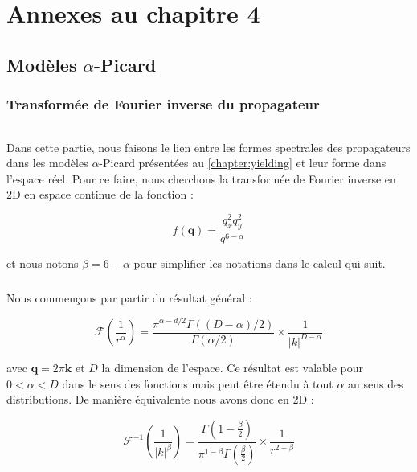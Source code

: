 \FloatBarrier

\chapter{Annexes au chapitre 4}



\section{Modèles $\alpha$-Picard}

\stoptocwriting

\subsection{Transformée de Fourier inverse du propagateur}

\label{sec:TFinverse}

\subparagraph{}Dans cette partie, nous faisons le lien entre les formes spectrales des propagateurs dans les modèles $\alpha$-Picard présentées au \autoref{chapter:yielding} et leur forme dans l'espace réel. Pour ce faire, nous cherchons la transformée de Fourier inverse en 2D en espace continue de la fonction :

\begin{equation}
	f(\mathbf{q}) = \frac{q_x^2 q_y^2}{q^{6-\alpha}}
\end{equation}

\noindent et nous notons $\beta = 6 - \alpha$ pour simplifier les notations dans le calcul qui suit.

\paragraph{}Nous commençons par partir du résultat général :

\begin{equation}
    \mathcal{F}\left( \frac{1}{r^\alpha} \right)=\frac{\pi^{\alpha-d / 2} \Gamma((D-\alpha) / 2)}{\Gamma(\alpha / 2)} \times\frac{1}{|k|^{D-\alpha}}
\end{equation}

\noindent avec $\mathbf{q} = 2\pi \mathbf{k}$ et $D$ la dimension de l'espace. Ce résultat est valable pour $0<\alpha<D$ dans le sens des fonctions mais peut être étendu à tout $\alpha$ au sens des distributions. De manière équivalente nous avons donc en 2D :

\begin{equation}
    \mathcal{F}^{-1}\left( \frac{1}{\lvert k \rvert^\beta} \right) = \frac{\Gamma\left( 1-\frac{\beta}{2} \right)}{\pi^{1-\beta}\Gamma\left( \frac{\beta}{2} \right)}\times\frac{1}{r^{2-\beta}}
\end{equation}

